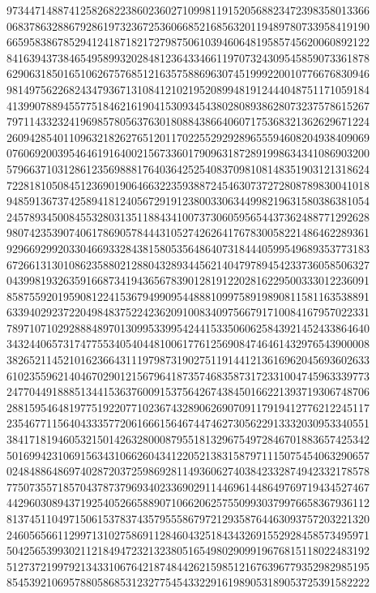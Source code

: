 {{    9734471488741258268223860236027109981191520568823472398358013366 ~
    0683786328867928619732367253606685216856320119489780733958419190 ~
    6659583867852941241871821727987506103946064819585745620060892122 ~
    8416394373846549589932028481236433466119707324309545859073361878 ~
    6290631850165106267576851216357588696307451999220010776676830946 ~
    9814975622682434793671310841210219520899481912444048751171059184 ~
    4139907889455775184621619041530934543802808938628073237578615267 ~
    7971143323241969857805637630180884386640607175368321362629671224 ~
    2609428540110963218262765120117022552929289655594608204938409069 ~
    0760692003954646191640021567336017909631872891998634341086903200 ~
    5796637103128612356988817640364252540837098108148351903121318624 ~
    7228181050845123690190646632235938872454630737272808789830041018 ~
    9485913673742589418124056729191238003306344998219631580386381054 ~
    2457893450084553280313511884341007373060595654437362488771292628 ~
    9807423539074061786905784443105274262641767830058221486462289361 ~
    9296692992033046693328438158053564864073184440599549689353773183 ~
    6726613130108623588021288043289344562140479789454233736058506327 ~
    0439981932635916687341943656783901281912202816229500333012236091 ~
    8587559201959081224153679499095448881099758919890811581163538891 ~
    6339402923722049848375224236209100834097566791710084167957022331 ~
    7897107102928884897013099533995424415335060625843921452433864640 ~
    3432440657317477553405404481006177612569084746461432976543900008 ~
    3826521145210162366431119798731902751191441213616962045693602633 ~
    6102355962140467029012156796418735746835873172331004745963339773 ~
    2477044918885134415363760091537564267438450166221393719306748706 ~
    2881595464819775192207710236743289062690709117919412776212245117 ~
    2354677115640433357720616661564674474627305622913332030953340551 ~
    3841718194605321501426328000879551813296754972846701883657425342 ~
    5016994231069156343106626043412205213831587971115075454063290657 ~
    0248488648697402872037259869281149360627403842332874942332178578 ~
    7750735571857043787379693402336902911446961448649769719434527467 ~
    4429603089437192540526658890710662062575509930379976658367936112 ~
    8137451104971506153783743579555867972129358764463093757203221320 ~
    2460565661129971310275869112846043251843432691552928458573495971 ~
    5042565399302112184947232132380516549802909919676815118022483192 ~
    5127372199792134331067642187484426215985121676396779352982985195 ~
    8545392106957880586853123277545433229161989053189053725391582222 ~
}}
